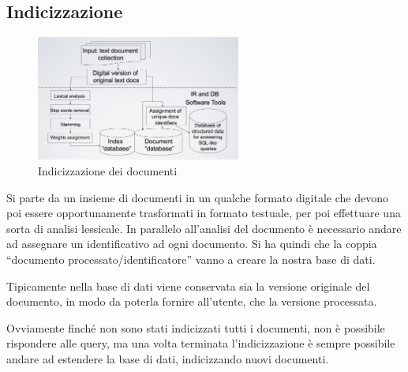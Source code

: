 

\subsection{Indicizzazione}

\begin{figure}
	\centering
	\includegraphics[width=0.6\textwidth]{images/l2-indicizzazione.png}
	\caption{Indicizzazione dei documenti}
\end{figure}

Si parte da un insieme di documenti in un qualche formato digitale che devono poi essere opportunamente trasformati in formato testuale, per poi effettuare una sorta di analisi lessicale.
In parallelo all'analisi del documento è necessario andare ad assegnare un identificativo ad ogni documento. Si ha quindi che la coppia ``documento processato/identificatore'' vanno a creare la nostra base di dati.

Tipicamente nella base di dati viene conservata sia la versione originale del documento, in modo da poterla fornire all'utente, che la versione processata.

Ovviamente finché non sono stati indicizzati tutti i documenti, non è possibile rispondere alle query, ma una volta terminata l'indicizzazione è sempre possibile andare ad estendere la base di dati, indicizzando nuovi documenti.

